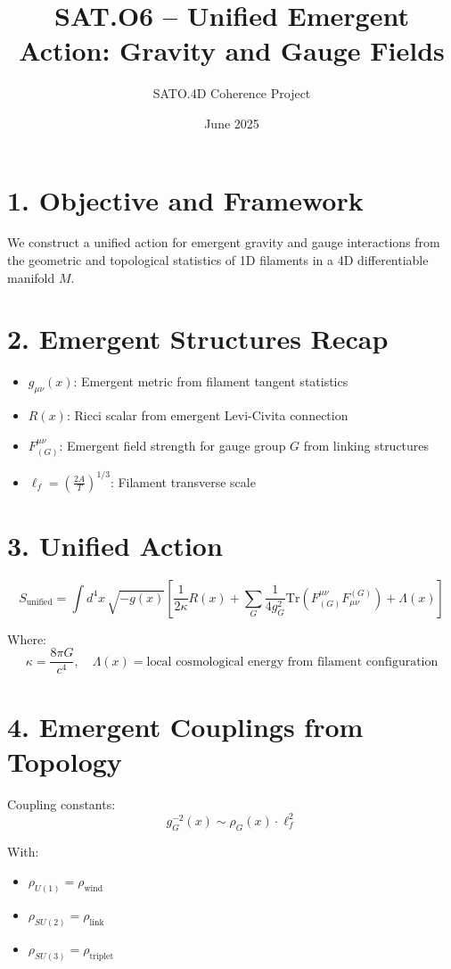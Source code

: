 \documentclass[12pt]{article}
\title{SAT.O6 – Unified Emergent Action: Gravity and Gauge Fields}
\author{SATO.4D Coherence Project}
\date{June 2025}
\begin{document}
\maketitle

\section*{1. Objective and Framework}

We construct a unified action for emergent gravity and gauge interactions from the geometric and topological statistics of 1D filaments in a 4D differentiable manifold \( M \).

\section*{2. Emergent Structures Recap}

\begin{itemize}
    \item \( g_{\mu\nu}(x) \): Emergent metric from filament tangent statistics
    \item \( R(x) \): Ricci scalar from emergent Levi-Civita connection
    \item \( F^{\mu\nu}_{(G)} \): Emergent field strength for gauge group \( G \) from linking structures
    \item \( \ell_f = \left( \frac{2A}{T} \right)^{1/3} \): Filament transverse scale
\end{itemize}

\section*{3. Unified Action}

\[
S_{\text{unified}} = \int d^4x \, \sqrt{-g(x)} \left[
\frac{1}{2\kappa} R(x)
+ \sum_G \frac{1}{4g_G^2} \text{Tr} \left( F^{\mu\nu}_{(G)} F_{\mu\nu}^{(G)} \right)
+ \Lambda(x)
\right]
\]

Where:
\[
\kappa = \frac{8\pi G}{c^4}, \quad
\Lambda(x) = \text{local cosmological energy from filament configuration}
\]

\section*{4. Emergent Couplings from Topology}

Coupling constants:
\[
g_G^{-2}(x) \sim \rho_G(x) \cdot \ell_f^2
\]

With:
\begin{itemize}
    \item \( \rho_{U(1)} = \rho_{\text{wind}} \)
    \item \( \rho_{SU(2)} = \rho_{\text{link}} \)
    \item \( \rho_{SU(3)} = \rho_{\text{triplet}} \)
\end{itemize}
\end{document}
